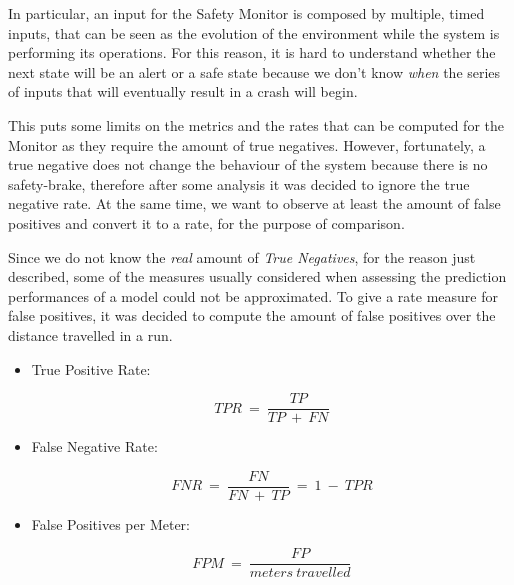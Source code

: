 In particular, an input for the Safety Monitor is composed by multiple, timed inputs, that can be seen as the evolution of the environment while the system is performing its operations. For this reason, it is hard to understand whether the next state will be an alert or a safe state because we don't know \textsl{when} the series of inputs that will eventually result in a crash will begin.

This puts some limits on the metrics and the rates that can be computed for the Monitor as they require the amount of true negatives. However, fortunately, a true negative does not change the behaviour of the system because there is no safety-brake, therefore after some analysis it was decided to ignore the true negative rate. At the same time, we want to observe at least the amount of false positives and convert it to a rate, for the purpose of comparison.\newline

Since we do not know the \textsl{real} amount of \textsl{True Negatives}, for the reason just described, some of the measures usually considered when assessing the prediction performances of a model could not be approximated. To give a rate measure for false positives, it was decided to compute the amount of false positives over the distance travelled in a run.









\begin{itemize}
	\item True Positive Rate:
	\vspace{-0.5cm}
	\begin{center}
		\begin{equation}
		TPR\: =\: \frac{TP}{TP\: +\: FN}
		\end{equation}
	\end{center}
	\item False Negative Rate:
	\vspace{-0.5cm}
	\begin{center}
		\begin{equation}
		FNR\: =\: \frac{FN}{FN\: +\: TP}\: =\: 1\: -\: TPR
		\end{equation}
	\end{center}
	\item False Positives per Meter:
	\vspace{-0.5cm}
	\begin{center}
		\begin{equation}
		FPM\: =\: \frac{FP}{meters\: travelled}
		\end{equation}
	\end{center}
\end{itemize}

